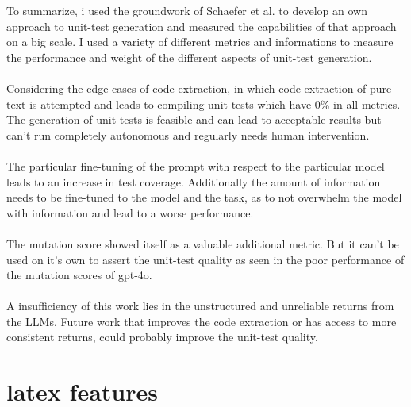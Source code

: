 \documentclass[a4paper,11pt,oneside]{memoir}
\begin{document}
\label{Conclusion}
To summarize, i used the groundwork of Schaefer et al.\cite{Schaefer_automated_unit_test_generation} to develop an own approach to unit-test generation and measured the capabilities of that approach on a big scale. I used a variety of different metrics and informations to measure the performance and weight of the different aspects of unit-test generation.\\\\
Considering the edge-cases of code extraction, in which code-extraction of pure text is attempted and leads to compiling unit-tests which have 0\% in all metrics. The generation of unit-tests is feasible and can lead to acceptable results but can't run completely autonomous and regularly needs human intervention.\\\\
The particular fine-tuning of the prompt with respect to the particular model leads to an increase in test coverage. Additionally the amount of information needs to be fine-tuned to the model and the task, as to not overwhelm the model with information and lead to a worse performance.\\\\
The mutation score showed itself as a valuable additional metric. But it can't be used on it's own to assert the unit-test quality as seen in the poor performance of the mutation scores of gpt-4o.\\\\
A insufficiency of this work lies in the unstructured and unreliable returns from the LLMs. Future work that improves the code extraction or has access to more consistent returns, could probably improve the unit-test quality.  
		
\newpage
			
\chapter{latex features}
\noindent{}\\\\\\
\end{document}
